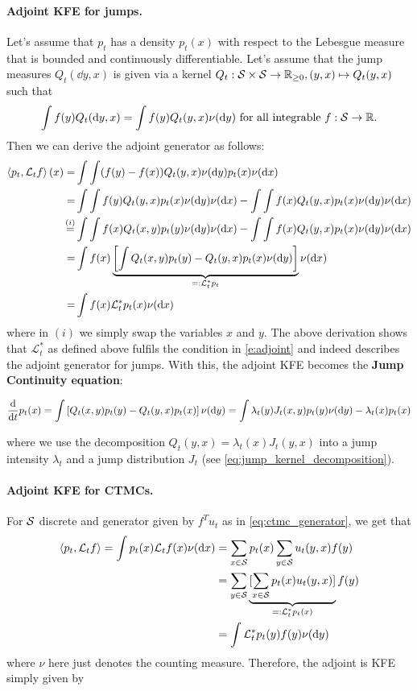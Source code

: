 \documentclass{fairmeta}
\newcommand{\highlight}[1]{{\color{metablue} \textbf{#1}}}
\numberwithin{equation}{section}
\begin{document}
\paragraph{Adjoint KFE for jumps.} Let's assume that $p_t$ has a density $p_t(x)$ with respect to the Lebesgue measure that is bounded and continuously differentiable. Let's assume that the jump measures $Q_t(\dd y,x)$ is given via a kernel $Q_t:{\mathcal{S}}\times {\mathcal{S}}\to\mathbb{R}_{\geq 0}, (y,x)\mapsto Q_t(y,x)$ such that 
\begin{align}
    \int f(y)Q_t(\mathrm{d} y,x) = \int f(y) Q_t(y,x)\nu(\mathrm{d} y)\text{ for all integrable }f:{\mathcal{S}}\to\mathbb{R}.
\end{align}
Then we can derive the adjoint generator as follows:
\begin{align}
    \left \langle p_t, \mathcal{L}_tf\right \rangle(x) =&\int \int (f(y)-f(x))Q_t(y,x)\nu(\mathrm{d} y)p_t(x)\nu(\mathrm{d} x)\\
    =&\int \int f(y)Q_t(y,x)p_t(x)\nu(\mathrm{d} y)\nu(\mathrm{d} x)-\int \int f(x)Q_t(y,x)p_t(x)\nu(\mathrm{d} y)\nu(\mathrm{d} x)\\
\overset{(i)}{=}&\int \int f(x)Q_t(x,y)p_t(y)\nu(\mathrm{d} y)\nu(\mathrm{d} x)-\int \int f(x)Q_t(y,x)p_t(x)\nu(\mathrm{d} y)\nu(\mathrm{d} x)\\
=&\int f(x)\underbrace{\left[\int Q_t(x,y)p_t(y)-Q_t(y,x)p_t(x)\nu(\mathrm{d} y)\right]}_{=:\mathcal{L}_t^*p_t}\nu(\mathrm{d} x)\\
=&\int f(x)\mathcal{L}_t^*p_t(x)\nu(\mathrm{d} x)
\end{align}
where in $(i)$ we simply swap the variables $x$ and $y$. The above derivation shows that $\mathcal{L}_t^*$ as defined above fulfils the condition in \cref{e:adjoint} and indeed describes the adjoint generator for jumps. With this, the adjoint KFE becomes the \highlight{Jump Continuity equation}:

\begin{myframe}
\begin{equation}
\label{eq:jump_continuity}
    \frac{\mathrm{d}}{\mathrm{d} t} p_t(x)=\int \left [Q_t(x,y)p_t(y)-Q_t(y,x)p_t(x)\right ]\nu(\mathrm{d} y)=\int \lambda_t(y)J_t(x,y)p_t(y)\nu(\mathrm{d} y)-\lambda_t(x)p_t(x)
\end{equation}
\end{myframe}
where we use the decomposition $Q_t(y,x)=\lambda_t(x)J_t(y,x)$ into a jump intensity $\lambda_t$ and a jump distribution $J_t$ (see \cref{eq:jump_kernel_decomposition}).

\paragraph{Adjoint KFE for CTMCs.} For ${\mathcal{S}}$ discrete and generator given by $f^Tu_t$ as in \cref{eq:ctmc_generator}, we get that
\begin{align*}
\left \langle p_t, \mathcal{L}_tf\right \rangle
=\int p_t(x)\mathcal{L}_tf(x)\nu(\mathrm{d} x)
&=\sum\limits_{x\in {\mathcal{S}}}p_t(x)\sum\limits_{y\in {\mathcal{S}}}u_t(y,x)f(y)\\
&=\sum\limits_{y\in {\mathcal{S}}}\underbrace{[\sum\limits_{x\in {\mathcal{S}}}p_t(x)u_t(y,x)]}_{=:\mathcal{L}_t^*p_t(x)}f(y)\\
&=\int \mathcal{L}_t^*p_t(y)f(y)\nu(\mathrm{d} y)
\end{align*}
where $\nu$ here just denotes the counting measure. Therefore, the adjoint is KFE simply given by 
\end{document}
